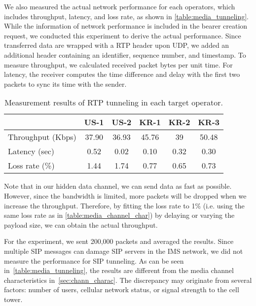 We also measured the actual network performance for each operators,
which includes throughput, latency, and loss rate, as shown in
\autoref{table:media_tunneling}. While the information of network
performance is included in the bearer creation request, we conducted this
experiment to derive the actual performance. Since transferred data are
wrapped with a RTP header upon UDP, we added an additional header
containing an identifier, sequence number, and timestamp.  To measure
throughput, we calculated received packet bytes per unit time.  For
latency, the receiver computes the time difference and delay with the first
two packets to sync its time with the sender.

\begin{table}[h]
  \caption{Measurement results of RTP tunneling in each target operator.}
  \label{table:media_tunneling}
  \renewcommand{\arraystretch}{1.4}
  \renewcommand{\tabcolsep}{1.2mm}
  \centering
  \begin{tabular}{l| c c c c c}
    \hline
    & \bf{US-1} & \bf{US-2} & \bf{KR-1} & \bf{KR-2} & \bf{KR-3} \\
    \hline\hline
    Throughput (Kbps) & 37.90& 36.93& 45.76& 39 & 50.48\\
    Latency (sec) & 0.52& 0.02 & 0.10& 0.32 & 0.30\\
    Loss rate (\%) & 1.44& 1.74& 0.77& 0.65 & 0.73 \\
    \hline
  \end{tabular}
\end{table}



Note that in our hidden data channel, we can send data as fast as
possible. However, since the bandwidth is limited, more packets will
be dropped when we increase the throughput. Therefore, by fitting the
loss rate to 1\% (i.e. using the same loss rate as in
\autoref{table:media_channel_char}) by delaying or varying the payload size, we
can obtain the actual throughput.

For the experiment, we sent 200,000 packets and averaged the results.
Since multiple SIP messages can damage SIP servers in the IMS network,
we did not measure the performance for SIP tunneling.  As can be seen
in~\autoref{table:media_tunneling}, the results are different from the media channel
characteristics in~\autoref{sec:chann_charac}. The discrepancy may originate from several factors: number of users, cellular network
status, or signal strength to the cell tower.


